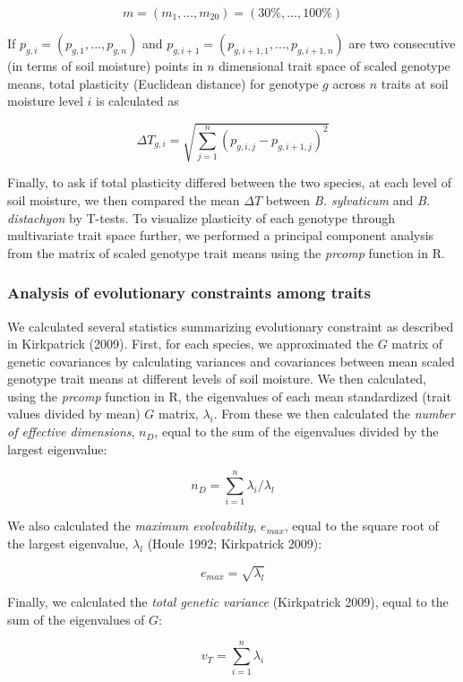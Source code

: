 \documentclass[jou,floatsintext]{apa6}
\begin{document}
\[m=(m_1,...,m_{20})=(30\%,...,100\%)\]

If \(p_{g,i} = (p_{g,1},...,p_{g,n})\) and \(p_{g,i+1} = (p_{g,i+1,1},...,p_{g,i+1,n})\) are two consecutive (in terms of soil moisture) points in \(n\) dimensional trait space of scaled genotype means, total plasticity (Euclidean distance) for genotype \(g\) across \(n\) traits at soil moisture level \(i\) is calculated as

\[\Delta T_{g,i}=\sqrt{\sum_{j=1}^{n}(p_{g,i,j}-p_{g,i+1,j})^2}\]

Finally, to ask if total plasticity differed between the two species, at each level of soil moisture, we then compared the mean \(\Delta{T}\) between \emph{B. sylvaticum} and \emph{B. distachyon} by T-tests. To visualize plasticity of each genotype through multivariate trait space further, we performed a principal component analysis from the matrix of scaled genotype trait means using the \emph{prcomp} function in R.

\hypertarget{analysis-of-evolutionary-constraints-among-traits}{%
\subsubsection{Analysis of evolutionary constraints among traits}\label{analysis-of-evolutionary-constraints-among-traits}}

We calculated several statistics summarizing evolutionary constraint as described in Kirkpatrick (2009). First, for each species, we approximated the \(G\) matrix of genetic covariances by calculating variances and covariances between mean scaled genotype trait means at different levels of soil moisture. We then calculated, using the \emph{prcomp} function in R, the eigenvalues of each mean standardized (trait values divided by mean) \(G\) matrix, \(\lambda_i\). From these we then calculated the \emph{number of effective dimensions}, \(n_{D}\), equal to the sum of the eigenvalues divided by the largest eigenvalue:

\[n_{D} = \sum_{i=1}^{n} \lambda_i/\lambda_l\]

We also calculated the \emph{maximum evolvability}, \(e_{max}\), equal to the square root of the largest eigenvalue, \(\lambda_l\) (Houle 1992; Kirkpatrick 2009):

\[e_{max} = \sqrt{\lambda_l}\]

Finally, we calculated the \emph{total genetic variance} (Kirkpatrick 2009), equal to the sum of the eigenvalues of \(G\):

\[v_T = \sum_{i=1}^{n} \lambda_i\]
\end{document}

